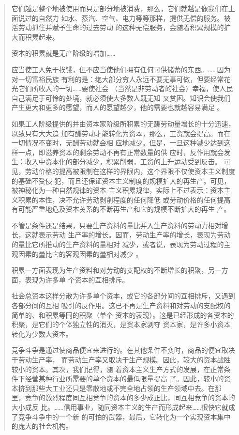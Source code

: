 \begin{quotation}
它们越是整个地被使用而只是部分地被消费，那么，它们就越是像我们在上面说过的自然力
如水、蒸汽、空气、电力等等那样，提供无偿的服务。被活劳动抓住并赋予生命的过去劳动
的这种无偿服务，会随着积累规模的扩大而积累起来。

资本的积累就是无产阶级的增加……

应当使工人免于挨饿，但不应当使他们拥有任何可供储蓄的东西。……因为对一切富裕民族
有利的是：绝大部分穷人永远不要无事可做，但要经常花光它们所收入的一切……要使社会
（当然是非劳动者的社会）幸福，使人民自己满足于可怜的处境，就必须使大多数人既无知
又贫困。知识会使我们产生更大和更多的愿望，而人的愿望越少，他的需要也就越容易满足
。

如果工人阶级提供的并由资本家阶级所积累的无酬劳动量增长的十分迅速，以致只有大大追
加有酬劳动才能转化为资本，那么，工资就会提高。而在一切情况不变时，无酬劳动就会相
应地减少。但是，一旦这种减少达到这样一点，即滋养资本的剩余劳动不再有正常数量的供
应时，反作用就会发生：收入中资本化的部分减少，积累削弱，工资的上升运动受到反击。
可见，劳动价格的提高被限制在这样的界限内，这个界限不仅使资本主义制度的基础不受侵
犯，而且还保证资本主义制度的规模扩大的再生产。可见，被神秘化为一种自然规律的资本
主义积累规律，实际上不过表示：资本主义积累的本性，决不允许劳动剥削程度的任何降低
或劳动价格的任何提高有可能严重地危及资本关系的不断再生产和它的规模不断扩大的再生
产。

不管是条件还是结果，只要生产资料的量比并入生产资料的劳动力相对增长，这就表示劳动
生产率的增长。因而，劳动生产率的增长，表现为劳动的量比它所推动的生产资料的量相对
减少，或者说，表现为劳动过程的主观因素的量比它的客观因素的量相对减少
。

积累一方面表现为生产资料和对劳动的支配权的不断增长的积聚，另一方面，表现为许多单
个资本的互相排斥。

社会总资本这样分散为许多单个资本，或它的各部分间的互相排斥，又遇到各部分间的互相
吸引的反作用。这已不再是生产资料和对劳动的支配权的简单的、和积累等同的积聚（单个
资本的表现）。这是已经形成的各资本的积聚，是它们的个体独立性的消灭，是资本家剥夺
资本家，是许多小资本转化为少数大资本。

竞争斗争是通过使商品便宜来进行的。在其他条件不变时，商品的便宜取决于劳动生产率，
而劳动生产率又取决于生产规模。因此，较大的资本战胜较小的资本。其次，我们记得，随
着资本主义生产方式的发展，在正常条件下经营某种行业所需要的单个资本的最低限量提高
了。因此，较小的资本挤到那些大工业还只是零散地或不完全地占领的生产领域中去。在那
里，竞争的激烈程度同互相竞争的资本的多少成正比，同互相竞争的资本的大小成反
比。……信用事业，随同资本主义的生产而形成起来……很快它就成了竞争斗争中的一个新
的可怕的武器，最后，它转化为一个实现资本集中的庞大的社会机构。


\end{quotation}
